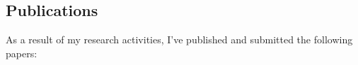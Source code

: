 \documentclass[runningheads]{llncs}
\begin{document}


\subsection{Publications}

As a result of my research activities,
I've published and submitted the following papers:


\begin{refsection}
    \nocite{*} %
    \printbibliography[heading=none]
\end{refsection}

\end{document}
